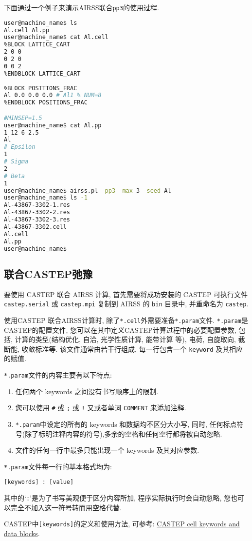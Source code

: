 \documentclass[a4paper, 10pt]{article}
\begin{document}
下面通过一个例子来演示AIRSS联合\verb|pp3|的使用过程.
\begin{lstlisting}[language={bash}]
user@machine_name$ ls 
Al.cell Al.pp
user@machine_name$ cat Al.cell
%BLOCK LATTICE_CART
2 0 0
0 2 0
0 0 2 
%ENDBLOCK LATTICE_CART
 
%BLOCK POSITIONS_FRAC
Al 0.0 0.0 0.0 # Al1 % NUM=8
%ENDBLOCK POSITIONS_FRAC

#MINSEP=1.5
user@machine_name$ cat Al.pp
1 12 6 2.5
Al
# Epsilon
1
# Sigma
2
# Beta
1
user@machine_name$ airss.pl -pp3 -max 3 -seed Al
user@machine_name$ ls -1
Al-43867-3302-1.res
Al-43867-3302-2.res
Al-43867-3302-3.res
Al-43867-3302.cell
Al.cell
Al.pp
user@machine_name$
\end{lstlisting}

\subsection{联合CASTEP弛豫}
要使用 CASTEP 联合 AIRSS 计算, 首先需要将成功安装的 CASTEP 可执行文件 \verb|castep.serial| 或 \verb|castep.mpi| 复制到 AIRSS 的 \verb|bin| 目录中, 并重命名为 \verb|castep|.

使用CASTEP 联合AIRSS计算时, 除了\verb|*.cell|外需要准备\verb|*.param|文件. \verb|*.param|是CASTEP的配置文件, 您可以在其中定义CASTEP计算过程中的必要配置参数, 包括, 计算的类型(结构优化, 自洽, 光学性质计算, 能带计算 等), 电荷, 自旋取向, 截断能, 收敛标准等. 该文件通常由若干行组成, 每一行包含一个 \verb|keyword| 及其相应的赋值.

\verb|*.param|文件的内容主要有以下特点:
\begin{enumerate}[(1)]
\item 任何两个 keywords 之间没有书写顺序上的限制.
\item 您可以使用 \verb|#| 或 \verb|;| 或 \verb|!| 又或者单词 \verb|COMMENT| 来添加注释.
\item \verb|*.param|中设定的所有的 keywords 和数据均不区分大小写, 同时, 任何标点符号(除了标明注释内容的符号),多余的空格和任何空行都将被自动忽略.
\item 文件的任何一行中最多只能出现一个 keywords 及其对应参数.
\end{enumerate}

\verb|*.param|文件每一行的基本格式均为:
\begin{lstlisting}
[keywords] : [value]
\end{lstlisting}
其中的`\verb|:|'是为了书写美观便于区分内容所加, 程序实际执行时会自动忽略, 您也可以完全不加入这一符号转而用空格代替.

CASTEP中\verb|[keywords]|的定义和使用方法, 可参考: \href{http://www.tcm.phy.cam.ac.uk/castep/documentation/WebHelp/content/modules/castep/keywords/k_main_structure.htm}{CASTEP cell keywords and data blocks}.
\end{document}

